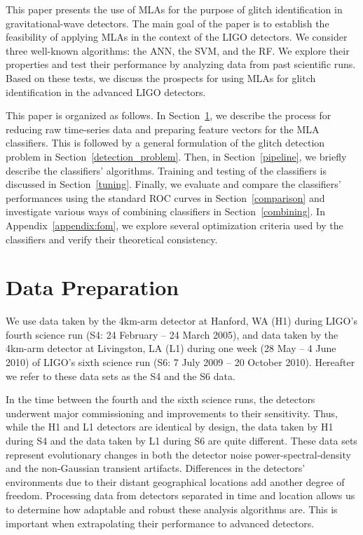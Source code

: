 \documentclass[prd, twocolumn, lengthcheck, superscriptaddress, showpacs, letterpaper, nofootinbib]{revtex4-1}
\begin{document}
This paper presents the use of \ac{MLA}s for the purpose of glitch identification in gravitational-wave detectors. The main goal of the paper is to establish the feasibility of applying \ac{MLA}s in the context of the \ac{LIGO} detectors. We consider three well-known algorithms: the \ac{ANN}, the \ac{SVM}, and the \ac{RF}. We explore their properties and test their performance by analyzing data from past scientific runs. Based on  these tests, we discuss the prospects for using \ac{MLA}s for glitch identification in the advanced \ac{LIGO} detectors.

This paper is organized as follows. In Section~\ref{sec:dataprep}, we describe the process for reducing raw time-series data and preparing feature vectors for the \ac{MLA} classifiers. This is followed by a general formulation of the glitch detection problem in Section~\ref{detection_problem}. Then, in Section~\ref{pipeline}, we briefly describe the classifiers'  algorithms. Training and testing of the classifiers is discussed in Section~\ref{tuning}. Finally, we evaluate and compare the classifiers' performances using the standard \ac{ROC} curves in Section~\ref{comparison} and investigate various ways of combining classifiers in Section~\ref{combining}. In Appendix~\ref{appendix:fom}, we explore several optimization criteria used by the classifiers and verify their theoretical consistency.  

\section{Data Preparation}
\label{sec:dataprep}

We use data taken by the 4km-arm detector at Hanford, WA (H1) during \ac{LIGO}'s fourth science run (S4: 24 February -- 24 March 2005), and data taken by the 4km-arm detector at Livingston, LA (L1) during one week (28 May -- 4 June 2010) of \ac{LIGO}'s sixth science run (S6: 7 July 2009 -- 20 October 2010). Hereafter we refer to these data sets as the S4 and the S6 data. 

In the time between the fourth and the sixth science runs, the detectors
underwent major commissioning and improvements to their sensitivity. Thus,
while the H1 and L1 detectors are identical by design, the data taken by H1
during S4 and the data taken by L1 during S6 are quite different. These data
sets represent evolutionary changes in both the detector noise
power-spectral-density and the non-Gaussian transient artifacts.
Differences in the detectors' environments due to their distant geographical
locations add another degree of freedom. Processing data from detectors
separated in time and location allows us to determine how adaptable and robust
these analysis algorithms are. This is important when extrapolating their
performance to advanced detectors.         
\end{document}
